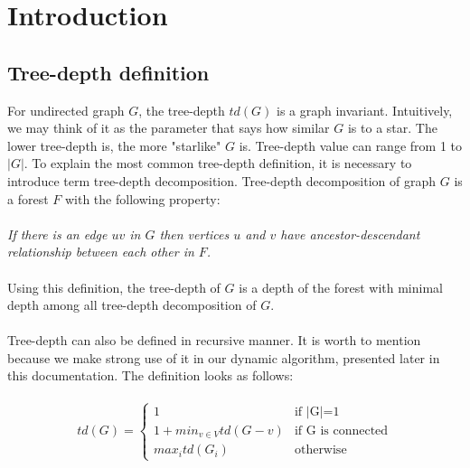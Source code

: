 \section{Introduction}
\subsection{Tree-depth definition}
For undirected graph $G$, the tree-depth $td(G)$ is a graph invariant. Intuitively, we may think of it as the parameter that says how similar $G$ is to a star. The lower tree-depth is, the more "starlike" $G$ is.
Tree-depth value can range from 1 to $|G|$.
To explain the most common tree-depth definition, it is necessary to introduce term tree-depth decomposition. Tree-depth decomposition of graph $G$ is a forest $F$ with the following property:\\\\
\emph{If there is an edge $uv$ in $G$ then vertices $u$ and $v$ have ancestor-descendant relationship between each other in $F$.}\\\\
Using this definition, the tree-depth of $G$ is a depth of the forest with minimal depth among all tree-depth decomposition of $G$.\\\\
Tree-depth can also be defined in recursive manner. It is worth to mention because we make strong use of it in our dynamic algorithm, presented later in this documentation. The definition looks as follows:\\\\
\begin{equation}
td(G) =
\begin{cases}
1 & \text{if $|$G$|$=1}\\
1+min_{v \in V} td(G-v) & \text{if G is connected}\\
max_{i} td(G_{i})  & \text{otherwise}
\end{cases}       
\end{equation}
\\\\
